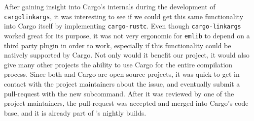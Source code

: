 After gaining insight into Cargo's internals during the development of \texttt{cargo\-linkargs}, it was interesting to see if we could get this same functionality into Cargo itself by implementing \texttt{cargo-rustc}.
Even though \texttt{cargo-linkargs} worked great for its purpose, it was not very ergonomic for \texttt{emlib} to depend on a third party plugin in order to work, especially if this functionality could be natively supported by Cargo.
Not only would it benefit our project, it would also give many other {\rust} projects the ability to use Cargo for the entire compilation process.
Since both {\rust} and Cargo are open source projects, it was quick to get in contact with the project maintainers about the issue, and eventually submit a pull-request with the new subcommand.
After it was reviewed by one of the project maintainers, the pull-request was accepted and merged into Cargo's code base, and it is already part of {\rust}'s nightly builds.
